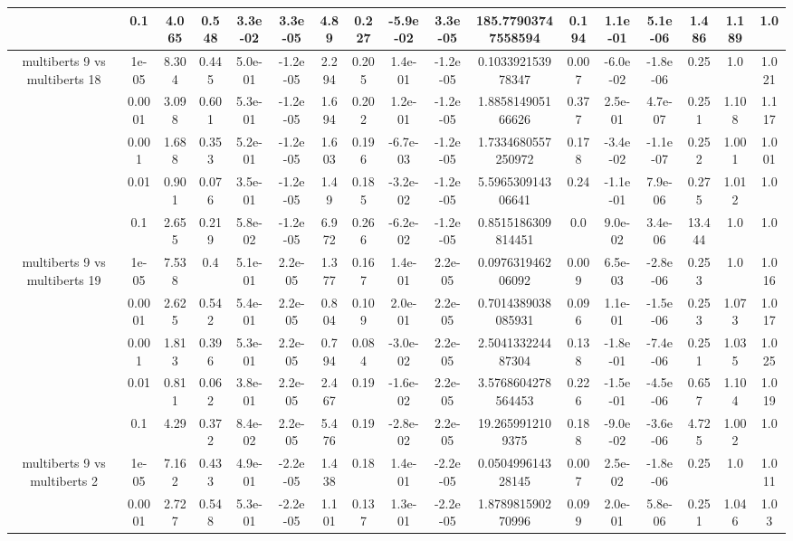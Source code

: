 \begin{tabular}{|c|c|c|c|c|c|c|c|c|c|c|c|c|c|c|c|c|}
 & 0.1 & 4.065 & 0.548 & 3.3e-02 & 3.3e-05 & 4.89 & 0.227 & -5.9e-02 & 3.3e-05 & 185.77903747558594 & 0.194 & 1.1e-01 & 5.1e-06 & 1.486 & 1.189 & 1.0 \\
\hline
\multirow{5}{*}{multiberts 9 vs multiberts 18} & 1e-05 & 8.304 & 0.445 & 5.0e-01 & -1.2e-05 & 2.294 & 0.205 & 1.4e-01 & -1.2e-05 & 0.103392153978347 & 0.007 & -6.0e-02 & -1.8e-06 & 0.25 & 1.0 & 1.021 \\
 & 0.0001 & 3.098 & 0.601 & 5.3e-01 & -1.2e-05 & 1.694 & 0.202 & 1.2e-01 & -1.2e-05 & 1.885814905166626 & 0.377 & 2.5e-01 & 4.7e-07 & 0.251 & 1.108 & 1.117 \\
 & 0.001 & 1.688 & 0.353 & 5.2e-01 & -1.2e-05 & 1.603 & 0.196 & -6.7e-03 & -1.2e-05 & 1.7334680557250972 & 0.178 & -3.4e-02 & -1.1e-07 & 0.252 & 1.001 & 1.001 \\
 & 0.01 & 0.901 & 0.076 & 3.5e-01 & -1.2e-05 & 1.49 & 0.185 & -3.2e-02 & -1.2e-05 & 5.596530914306641 & 0.24 & -1.1e-01 & 7.9e-06 & 0.275 & 1.012 & 1.0 \\
 & 0.1 & 2.655 & 0.219 & 5.8e-02 & -1.2e-05 & 6.972 & 0.266 & -6.2e-02 & -1.2e-05 & 0.8515186309814451 & 0.0 & 9.0e-02 & 3.4e-06 & 13.444 & 1.0 & 1.0 \\
\hline
\multirow{5}{*}{multiberts 9 vs multiberts 19} & 1e-05 & 7.538 & 0.4 & 5.1e-01 & 2.2e-05 & 1.377 & 0.167 & 1.4e-01 & 2.2e-05 & 0.097631946206092 & 0.009 & 6.5e-03 & -2.8e-06 & 0.253 & 1.0 & 1.016 \\
 & 0.0001 & 2.625 & 0.542 & 5.4e-01 & 2.2e-05 & 0.804 & 0.109 & 2.0e-01 & 2.2e-05 & 0.7014389038085931 & 0.096 & 1.1e-01 & -1.5e-06 & 0.253 & 1.073 & 1.017 \\
 & 0.001 & 1.813 & 0.396 & 5.3e-01 & 2.2e-05 & 0.794 & 0.084 & -3.0e-02 & 2.2e-05 & 2.504133224487304 & 0.138 & -1.8e-01 & -7.4e-06 & 0.251 & 1.035 & 1.025 \\
 & 0.01 & 0.811 & 0.062 & 3.8e-01 & 2.2e-05 & 2.467 & 0.19 & -1.6e-02 & 2.2e-05 & 3.5768604278564453 & 0.226 & -1.5e-01 & -4.5e-06 & 0.657 & 1.104 & 1.019 \\
 & 0.1 & 4.29 & 0.372 & 8.4e-02 & 2.2e-05 & 5.476 & 0.19 & -2.8e-02 & 2.2e-05 & 19.2659912109375 & 0.188 & -9.0e-02 & -3.6e-06 & 4.725 & 1.002 & 1.0 \\
\hline
\multirow{5}{*}{multiberts 9 vs multiberts 2} & 1e-05 & 7.162 & 0.433 & 4.9e-01 & -2.2e-05 & 1.438 & 0.18 & 1.4e-01 & -2.2e-05 & 0.050499614328145 & 0.007 & 2.5e-02 & -1.8e-06 & 0.25 & 1.0 & 1.011 \\
 & 0.0001 & 2.727 & 0.548 & 5.3e-01 & -2.2e-05 & 1.101 & 0.137 & 1.3e-01 & -2.2e-05 & 1.878981590270996 & 0.099 & 2.0e-01 & 5.8e-06 & 0.251 & 1.046 & 1.03 \\

\end{tabular}
